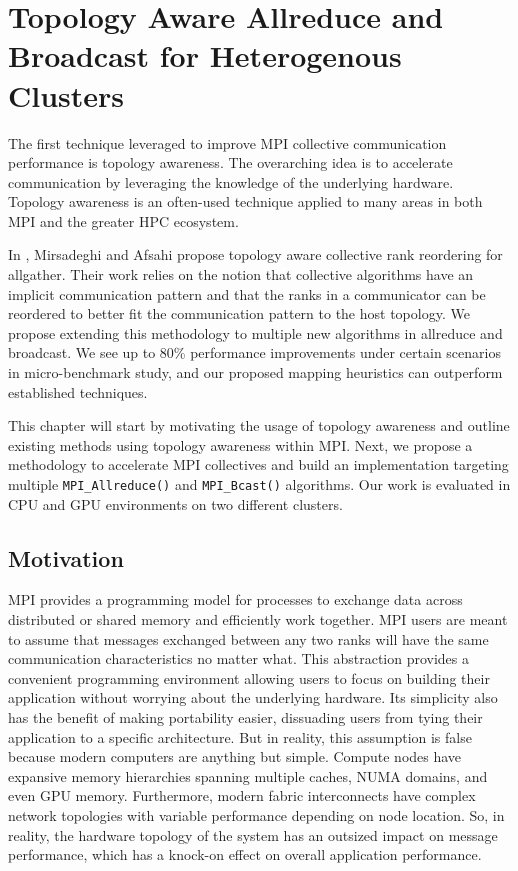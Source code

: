 
\chapter[Topology Aware Allreduce and Broadcast for Heterogenous Clusters]{Topology Aware Allreduce and Broadcast for Heterogenous Clusters }\label{ch:CH4-TopologyAwareness}

The first technique leveraged to improve \gls{MPI} collective communication performance is topology awareness.
The overarching idea is to accelerate communication by leveraging the knowledge of the underlying hardware.
Topology awareness is an often-used technique applied to many areas in both \gls{MPI} and the greater \gls{HPC} ecosystem.

In \cite{Mirsadeghi2016TopoAwareCollRR}, Mirsadeghi and Afsahi propose topology aware collective rank reordering for allgather.
Their work relies on the notion that collective algorithms have an implicit communication pattern and that the ranks in a communicator can be reordered to better fit the communication pattern to the host topology.
We propose extending this methodology to multiple new algorithms in allreduce and broadcast.
We see up to 80\% performance improvements under certain scenarios in micro-benchmark study, and our proposed mapping heuristics can outperform established techniques.

This chapter will start by motivating the usage of topology awareness and outline existing methods using topology awareness within \gls{MPI}.
Next, we propose a methodology to accelerate \gls{MPI} collectives and build an implementation targeting multiple \texttt{MPI\_Allreduce()} and \texttt{MPI\_Bcast()} algorithms.
Our work is evaluated in \gls{CPU} and \gls{GPU} environments on two different clusters.

\section{Motivation}
\gls{MPI} provides a programming model for processes to exchange data across distributed or shared memory and efficiently work together.
\gls{MPI} users are meant to assume that messages exchanged between any two ranks will have the same communication characteristics no matter what.
This abstraction provides a convenient programming environment allowing users to focus on building their application without worrying about the underlying hardware. 
Its simplicity also has the benefit of making portability easier, dissuading users from tying their application to a specific architecture.
But in reality, this assumption is false because modern computers are anything but simple. 
Compute nodes have expansive memory hierarchies spanning multiple caches, \gls{NUMA} domains, and even \gls{GPU} memory.
Furthermore, modern fabric interconnects have complex network topologies with variable performance depending on node location.
So, in reality, the hardware topology of the system has an outsized impact on message performance, which has a knock-on effect on overall application performance. 

